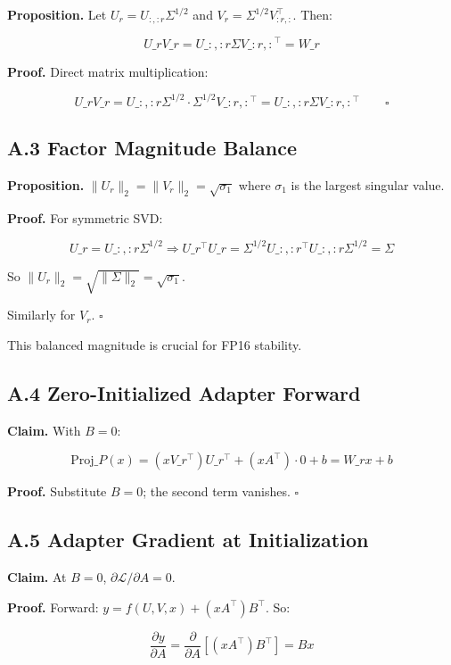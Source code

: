 \textbf{Proposition.} Let $U_r = U_{:, :r} \Sigma^{1/2}$ and $V_r = \Sigma^{1/2} V_{:r, :}^\top$. 
Then:

\[
U\_r V\_r = U\_{:, :r} \Sigma V\_{:r, :}^\top = W\_r
\tag{A.3}
\]

\textbf{Proof.} Direct matrix multiplication:

\[
U\_r V\_r = U\_{:, :r} \Sigma^{1/2} \cdot \Sigma^{1/2} V\_{:r, :}^\top = U\_{:, :r} \Sigma V\_{:r, :}^\top \qquad \square
\]

\subsection{A.3 Factor Magnitude Balance}

\textbf{Proposition.} $\|U_r\|_2 = \|V_r\|_2 = \sqrt{\sigma_1}$ where $\sigma_1$ is 
the largest singular value.

\textbf{Proof.} For symmetric SVD:

\[
U\_r = U\_{:, :r} \Sigma^{1/2} \Rightarrow U\_r^\top U\_r = \Sigma^{1/2} U\_{:, :r}^\top U\_{:, :r} \Sigma^{1/2} = \Sigma
\tag{A.4}
\]

So $\|U_r\|_2 = \sqrt{\|\Sigma\|_2} = \sqrt{\sigma_1}$.

Similarly for $V_r$. $\square$

This balanced magnitude is crucial for FP16 stability.

\subsection{A.4 Zero-Initialized Adapter Forward}

\textbf{Claim.} With $B = 0$:

\[
\text{Proj}\_P(x) = (x V\_r^\top) U\_r^\top + (x A^\top) \cdot 0 + b = W\_r x + b
\tag{A.5}
\]

\textbf{Proof.} Substitute $B = 0$; the second term vanishes. $\square$

\subsection{A.5 Adapter Gradient at Initialization}

\textbf{Claim.} At $B = 0$, $\partial \mathcal{L} / \partial A = 0$.

\textbf{Proof.} Forward: $y = f(U, V, x) + (x A^\top) B^\top$. So:

\[
\frac{\partial y}{\partial A} = \frac{\partial}{\partial A} \left[ (x A^\top) B^\top \right] = B x
\tag{A.6}
\]


